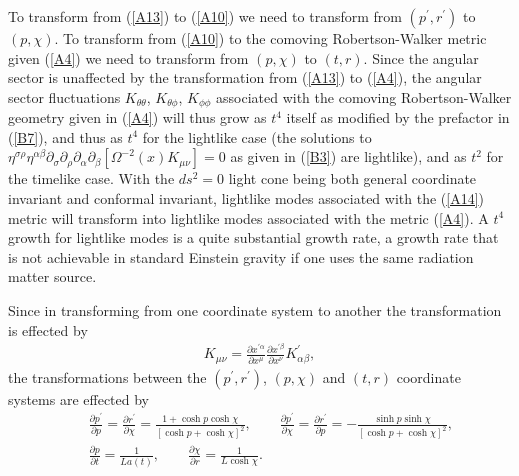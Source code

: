 To transform from (\ref{A13}) to (\ref{A10}) we need to transform from $(p^{\prime}, r^{\prime})$ to $(p,\chi)$. To transform from (\ref{A10}) to the comoving Robertson-Walker metric given (\ref{A4}) we need to transform from $(p,\chi)$ to $(t,r)$. Since the angular sector is unaffected by the transformation from (\ref{A13}) to (\ref{A4}), the angular sector fluctuations $K_{\theta\theta}$, $K_{\theta  \phi}$, $K_{\phi\phi}$ associated with the comoving Robertson-Walker geometry given in (\ref{A4}) will thus grow as $t^4$ itself as modified by the prefactor in (\ref{B7}), and thus as $t^4$ for the lightlike case (the solutions to $\eta^{\sigma\rho}\eta^{\alpha\beta}\partial_{\sigma}\partial_{\rho} \partial_{\alpha}\partial_{\beta}[\Omega^{-2}(x)K_{\mu\nu}]=0$ as given in  (\ref{B3}) are lightlike), and as $t^2$ for the timelike case. With the $ds^2=0$ light cone being both general coordinate invariant and conformal invariant, lightlike modes associated with the (\ref{A14}) metric will transform into lightlike modes associated with the metric (\ref{A4}). A $t^4$ growth for lightlike modes is a quite substantial growth rate, a growth rate that is not achievable in standard Einstein gravity if one uses the same radiation matter source. 

Since in transforming from one coordinate system to another the transformation is effected by 
%
\begin{eqnarray}
K_{\mu\nu}=\frac{\partial x^{\prime \alpha}}{\partial x^{\mu}}\frac{\partial x^{\prime\beta}}{\partial x^{\nu}}K^{\prime}_{\alpha\beta},
\label{B8}
\end{eqnarray}
%
the transformations between the $(p^{\prime}, r^{\prime})$, $(p,\chi)$ and $(t,r)$ coordinate systems are effected by
%
\begin{eqnarray}
&&\frac{\partial p^{\prime }}{\partial p}=\frac{\partial r^{\prime }}{\partial \chi}=\frac{1+\cosh p\cosh\chi}{[\cosh p+\cosh\chi]^2},\qquad
\frac{\partial p^{\prime }}{\partial \chi}=\frac{\partial r^{\prime }}{\partial p}=-\frac{\sinh p\sinh\chi}{[\cosh p+\cosh\chi]^2}, 
\nonumber\\
&& \frac{\partial p}{\partial t}=\frac{1}{La(t)},\qquad \frac{\partial \chi}{\partial r}=\frac{1}{L\cosh\chi}.
\label{B9}
\end{eqnarray}
%

